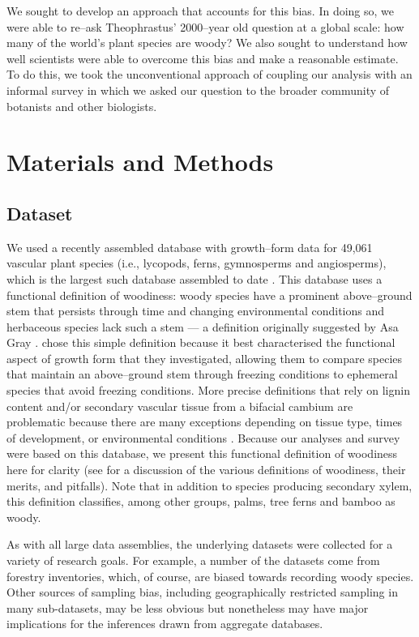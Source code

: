 \documentclass[a4paper,12pt]{article}
\begin{document}
We sought to develop an approach that accounts for this bias.  In
doing so, we were able to re--ask Theophrastus' 2000--year old
question at a global scale: how many of the world's plant species are
woody?
%
We also sought to understand how well scientists were able to overcome
this bias and make a reasonable estimate.  To do this, we took the
unconventional approach of coupling our analysis with an informal
survey in which we asked our question to the broader community of
botanists and other biologists.

\section{Materials and Methods}

\subsection{Dataset}

We used a recently assembled database with growth--form data for
49,061 vascular plant species (i.e., lycopods, ferns, gymnosperms and
angiosperms), which is the largest such database assembled to date
\citep[][available on the Dryad data repository; doi:10.5061/dryad.63q27/2]{Zanne}.
%
This database uses a functional definition of woodiness: woody species
have a prominent above--ground stem that persists through time and changing
environmental conditions and herbaceous species lack such a stem --- 
a definition originally suggested by Asa Gray \citeyearpar{gray1887elements}. 
\citet{Zanne}
chose this simple definition because it best characterised the functional
aspect of growth form that they investigated, allowing them to compare 
species that maintain an above--ground stem through freezing conditions to 
ephemeral species that avoid freezing conditions.  More precise definitions 
that rely on lignin content and/or secondary vascular tissue from a bifacial
cambium are problematic because there are many exceptions depending on tissue 
type, times of development, or environmental conditions 
\citep{Groover2005, Spicer2010, Rowe2012}.  
Because our analyses and survey were based on this database, 
we present this functional definition of woodiness here for clarity 
(see \citet{Zanne} for a discussion of the various definitions of woodiness, 
their merits, and pitfalls).  Note that in addition to species producing
secondary xylem, this definition
classifies, among other groups, palms, tree ferns and bamboo as
woody.

As with all large data assemblies, the underlying datasets were collected 
for a variety of research goals. For example, a number of the datasets come
from forestry inventories, which, of course, are biased towards recording
woody species. Other sources of sampling bias, including geographically restricted sampling 
in many sub-datasets, may be less obvious but
nonetheless may have major implications for the inferences drawn from 
aggregate databases.
\end{document}
